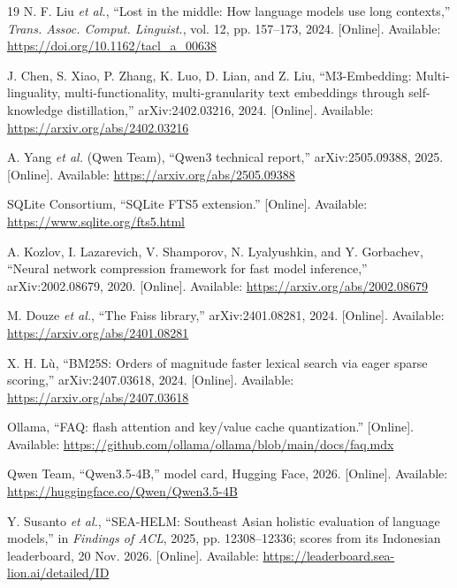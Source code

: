 \documentclass[conference]{IEEEtran}
\begin{document}
\begin{thebibliography}{19}
N. F. Liu \emph{et al.}, ``Lost in the middle: How language models use long
contexts,'' \emph{Trans. Assoc. Comput. Linguist.}, vol. 12, pp. 157--173,
2024. [Online]. Available: \url{https://doi.org/10.1162/tacl_a_00638}

J. Chen, S. Xiao, P. Zhang, K. Luo, D. Lian, and Z. Liu, ``M3-Embedding:
Multi-linguality, multi-functionality, multi-granularity text embeddings through
self-knowledge distillation,'' arXiv:2402.03216, 2024. [Online]. Available:
\url{https://arxiv.org/abs/2402.03216}

A. Yang \emph{et al.} (Qwen Team), ``Qwen3 technical report,'' arXiv:2505.09388,
2025. [Online]. Available: \url{https://arxiv.org/abs/2505.09388}

SQLite Consortium, ``SQLite FTS5 extension.'' [Online]. Available:
\url{https://www.sqlite.org/fts5.html}

A. Kozlov, I. Lazarevich, V. Shamporov, N. Lyalyushkin, and Y. Gorbachev,
``Neural network compression framework for fast model inference,''
arXiv:2002.08679, 2020. [Online]. Available:
\url{https://arxiv.org/abs/2002.08679}

M. Douze \emph{et al.}, ``The Faiss library,'' arXiv:2401.08281, 2024.
[Online]. Available: \url{https://arxiv.org/abs/2401.08281}

X. H. L\`u, ``BM25S: Orders of magnitude faster lexical search via eager sparse
scoring,'' arXiv:2407.03618, 2024. [Online]. Available:
\url{https://arxiv.org/abs/2407.03618}

Ollama, ``FAQ: flash attention and key/value cache quantization.'' [Online].
Available: \url{https://github.com/ollama/ollama/blob/main/docs/faq.mdx}

Qwen Team, ``Qwen3.5-4B,'' model card, Hugging Face, 2026. [Online].
Available: \url{https://huggingface.co/Qwen/Qwen3.5-4B}

Y. Susanto \emph{et al.}, ``SEA-HELM: Southeast Asian holistic evaluation of
language models,'' in \emph{Findings of ACL}, 2025, pp. 12308--12336; scores
from its Indonesian leaderboard, 20 Nov. 2026. [Online]. Available:
\url{https://leaderboard.sea-lion.ai/detailed/ID}

\end{thebibliography}
\end{document}
